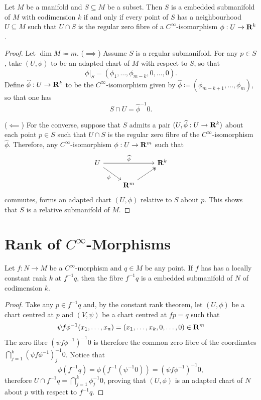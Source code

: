 \begin{lemma}
\label{lem:embedded-submanifold-iff-regular-fibre}
Let \(M\) be a manifold and \(S \subseteq M\) be a subset. Then \(S\) is a
embedded submanifold of \(M\) with codimension \(k\) if and only if every point
of \(S\) has a neighbourhood \(U \subseteq M\) such that \(U \cap S\) is the
regular zero fibre of a \(C^{\infty}\)-isomorphism \(\phi: U \to \mathbf{R}^k\).
\end{lemma}

\begin{proof}
Let \(\dim M \coloneq m\). (\(\implies\)) Assume \(S\) is a regular
submanifold. For any \(p \in S\), take \((U, \phi)\) to be an adapted chart of
\(M\) with respect to \(S\), so that
\[
\phi|_S = (\phi_1, \dots, \phi_{m-k}, 0, \dots, 0).
\]
Define \(\widehat\phi: U \to \mathbf{R}^k\) to be the \(C^{\infty}\)-isomorphism given
by \(\widehat\phi \coloneq (\phi_{m-k+1}, \dots, \phi_m)\), so that one has
\[
S \cap U = \widehat\phi^{-1} 0.
\]

(\(\impliedby\)) For the converse, suppose that \(S\) admits a pair
\((U, \widehat\phi: U \to \mathbf{R}^k)\) about each point \(p \in S\) such that
\(U \cap S\) is the regular zero fibre of the \(C^{\infty}\)-isomorphism
\(\widehat\phi\). Therefore, any \(C^{\infty}\)-isomorphism \(\phi: U \to \mathbf{R}^m\)
such that
\[
\begin{tikzcd}
U \ar[rr, "\widehat\phi"] \ar[rd, "\phi"']& &\R^k \\
&\R^m \ar[ru, two heads] &
\end{tikzcd}
\]
commutes, forms an adapted chart \((U, \phi)\) relative to \(S\) about
\(p\). This shows that \(S\) is a relative submanifold of \(M\).
\end{proof}

\section{Rank of \texorpdfstring{\(C^{\infty}\)}{Smooth}-Morphisms}

\begin{theorem}
\label{thm:constant-rank-fibre-is-embedded-submanifold}
Let \(f: N \to M\) be a \(C^{\infty}\)-morphism and \(q \in M\) be any point. If
\(f\) has has a locally constant rank \(k\) at \(f^{-1} q\), then the fibre
\(f^{-1} q\) is a embedded submanifold of \(N\) of codimension \(k\).
\end{theorem}

\begin{proof}
Take any \(p \in f^{-1} q\) and, by the constant rank theorem, let \((U, \phi)\)
be a chart centred at \(p\) and \((V, \psi)\) be a chart centred at \(f p = q\)
such that
\[
\psi f \phi^{-1}(x_1, \dots, x_n) = (x_1, \dots, x_k, 0, \dots, 0) \in \mathbf{R}^m
\]
The zero fibre \((\psi f \phi^{-1})^{-1} 0\) is therefore the common zero fibre
of the coordinates \(\bigcap_{j=1}^k (\psi f \phi^{-1})_j^{-1} 0\). Notice that
\[
\phi(f^{-1} q) = \phi (f^{-1}(\psi^{-1} 0)) = (\psi f \phi^{-1})^{-1} 0,
\]
therefore \(U \cap f^{-1} q = \bigcap_{j=1}^k \phi_j^{-1} 0\), proving that
\((U, \phi)\) is an adapted chart of \(N\) about \(p\) with respect to
\(f^{-1} q\).
\end{proof}

